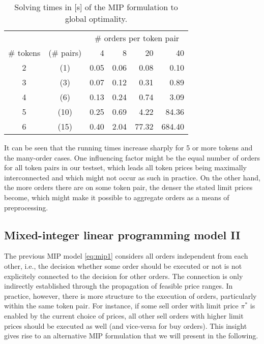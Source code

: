 \documentclass[11pt,parskip=full]{scrartcl}%
\newcommand*{\ie}{i.e., }
\begin{document}
\begin{table}
  \centering
  \begin{tabular}{ccrrrr}
    \toprule
    && \multicolumn{4}{c}{\# orders per token pair}\\
    \cmidrule{3-6}
    \# tokens & (\# pairs) &   4  &   8  &    20 &     40 \\
    \midrule
    2         &       (1)  & 0.05 & 0.06 &  0.08 &   0.10 \\
    3         &       (3)  & 0.07 & 0.12 &  0.31 &   0.89 \\
    4         &       (6)  & 0.13 & 0.24 &  0.74 &   3.09 \\
    5         &       (10) & 0.25 & 0.69 &  4.22 &  84.36 \\
    6         &       (15) & 0.40 & 2.04 & 77.32 & 684.40 \\
    \bottomrule
  \end{tabular}
  \caption{Solving times in [s] of the MIP formulation to global optimality.}
  \label{tab:mip_results}
\end{table}

It can be seen that the running times increase sharply for 5 or more tokens and the many-order
cases.
One influencing factor might be the equal number of orders for all token pairs in our testset,
which leads all token prices being maximally interconnected and which might not occur as such in
practice.
On the other hand, the more orders there are on some token pair, the denser the stated limit prices
become, which might make it possible to aggregate orders as a means of preprocessing.


\subsection{Mixed-integer linear programming model II}
\label{subsec:MIPmodel_2}

The previous MIP model \eqref{eq:mip1} considers all orders independent from each other, \ie the
decision whether some order should be executed or not is not explicitely connected to the decision
for other orders.
The connection is only indirectly established through the propagation of feasible price ranges.
In practice, however, there is more structure to the execution of orders, particularly within the
same token pair.
For instance, if some sell order with limit price $ \pi^* $ is enabled by the current choice of
prices, all other sell orders with higher limit prices should be executed as well (and vice-versa
for buy orders).
This insight gives rise to an alternative MIP formulation that we will present in the following.
\end{document}
